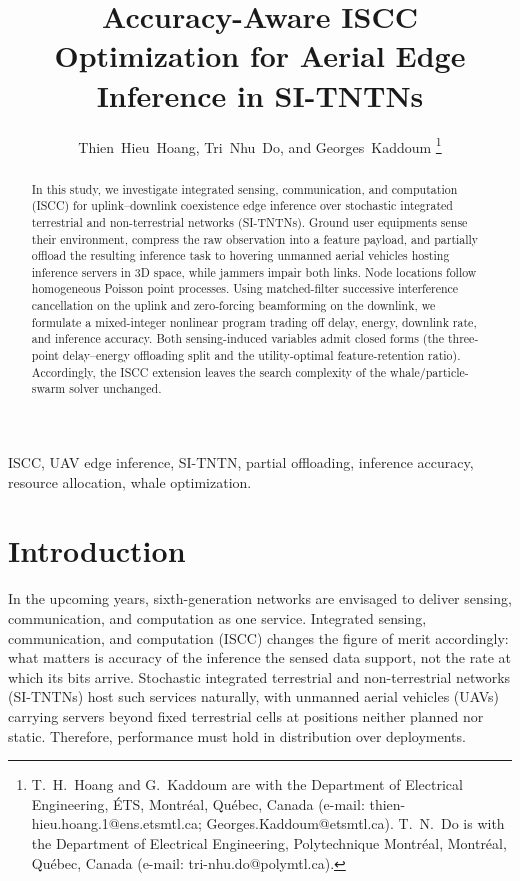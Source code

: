 \documentclass[journal]{IEEEtran}
\begin{document}
\title{Accuracy-Aware ISCC Optimization for Aerial Edge Inference in SI-TNTNs}

\author{Thien~Hieu~Hoang, Tri~Nhu~Do, and Georges~Kaddoum%
\thanks{T.~H.~Hoang and G.~Kaddoum are with the Department of Electrical Engineering, \'{E}TS, Montr\'{e}al, Qu\'{e}bec, Canada (e-mail: \mbox{thien-hieu.hoang.1@ens.etsmtl.ca}; \mbox{Georges.Kaddoum@etsmtl.ca}). T.~N.~Do is with the Department of Electrical Engineering, Polytechnique Montr\'{e}al, Montr\'{e}al, Qu\'{e}bec, Canada (e-mail: \mbox{tri-nhu.do@polymtl.ca}).}}
\maketitle

\begin{abstract}
In this study, we investigate integrated sensing, communication, and computation (ISCC) for uplink--downlink coexistence edge inference over stochastic integrated terrestrial and non-terrestrial networks (SI-TNTNs). Ground user equipments sense their environment, compress the raw observation into a feature payload, and partially offload the resulting inference task to hovering unmanned aerial vehicles hosting inference servers in 3D space, while jammers impair both links. Node locations follow homogeneous Poisson point processes. Using matched-filter successive interference cancellation on the uplink and zero-forcing beamforming on the downlink, we formulate a mixed-integer nonlinear program trading off delay, energy, downlink rate, and inference accuracy. Both sensing-induced variables admit closed forms (the three-point delay--energy offloading split and the utility-optimal feature-retention ratio). Accordingly, the ISCC extension leaves the search complexity of the whale/particle-swarm solver unchanged.
\end{abstract}

\begin{IEEEkeywords}
ISCC, UAV edge inference, SI-TNTN, partial offloading, inference accuracy, resource allocation, whale optimization.
\end{IEEEkeywords}

\section{Introduction}
In the upcoming years, sixth-generation networks are envisaged to deliver sensing, communication, and computation as one service. Integrated sensing, communication, and computation (ISCC) changes the figure of merit accordingly: what matters is accuracy of the inference the sensed data support, not the rate at which its bits arrive. Stochastic integrated terrestrial and non-terrestrial networks (SI-TNTNs) \cite{meftah2026sitntn} host such services naturally, with unmanned aerial vehicles (UAVs) carrying servers beyond fixed terrestrial cells at positions neither planned nor static. Therefore,  performance must hold in distribution over deployments.
\end{document}
